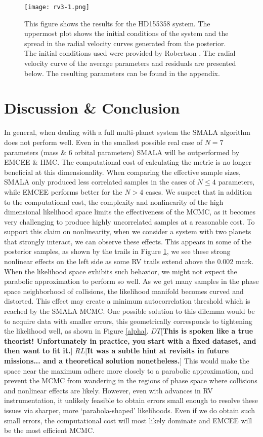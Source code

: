 \documentclass{aa}
\def\memodt#1{\color{green}$DT[${\bf #1}$]$ \color{black}}
\def\memorl#1{\color{gray}$RL[${\bf #1}$]$ \color{black}}
\begin{document}
\begin{figure}
\centering
\texttt{[image: rv3-1.png]}
   \caption{This figure shows the results for the HD155358 system. 
The uppermost plot shows the initial conditions of the system and the spread in the radial velocity curves generated from the posterior. 
The initial conditions used were provided by Robertson \cite{Robertson2012}. 
The radial velocity curve of the average parameters and residuals are presented below. 
The resulting parameters can be found in the appendix.}
      \label{FigHD}
\end{figure}

\section{Discussion \& Conclusion}
In general, when dealing with a full multi-planet system the SMALA algorithm does not perform well. 
Even in the smallest possible real case of $N=7$ parameters (mass \& 6 orbital parameters) SMALA will be outperformed by EMCEE \& HMC. 
The computational cost of calculating the metric is no longer beneficial at this dimensionality. 
When comparing the effective sample sizes, SMALA only produced less correlated samples in the cases of $N \leq 4$ parameters, while EMCEE performs better for the $N>4$ cases. 
We suspect that in addition to the computational cost, the complexity and nonlinearity of the high dimensional likelihood space limits the effectiveness of the MCMC, as it becomes very challenging to produce highly uncorrelated samples at a reasonable cost. 
To support this claim on nonlinearity, when we consider a system with two planets that strongly interact, we can observe these effects. 
This appears in some of the posterior samples, as shown by the trails in Figure \ref{FigHD}, we see these strong nonlinear effects on the left side as some RV trails extend above the $0.002$ mark. 
When the likelihood space exhibits such behavior, we might not expect the parabolic approximation to perform so well. 
As we get many samples in the phase space neighborhood of collisions, the likelihood manifold becomes curved and distorted. 
This effect may create a minimum autocorrelation threshold which is reached by the SMALA MCMC. 
One possible solution to this dilemma would be to acquire data with smaller errors, this geometrically corresponds to tightening the likelihood well, as shown in Figure \ref{alpha}. \memodt{This is spoken like a true theorist! Unfortunately in practice, you start with a fixed dataset, and then want to fit it.} \memorl{It was a subtle hint at revisits in future missions... and a theoretical solution nonetheless.}
This would make the space near the maximum adhere more closely to a parabolic approximation, and prevent the MCMC from wandering in the regions of phase space where collisions and nonlinear effects are likely. 
However, even with advances in RV instrumentation, it unlikely feasible to obtain errors small enough to resolve these issues via sharper, more `parabola-shaped' likelihoods. 
Even if we do obtain such small errors, the computational cost will most likely dominate and EMCEE will be the most efficient MCMC.
\end{document}
